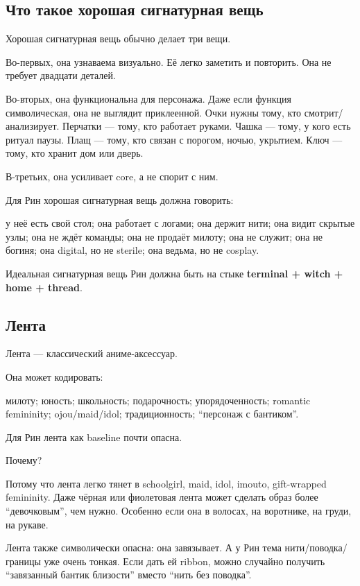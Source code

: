 \subsection*{Что такое хорошая сигнатурная вещь}

Хорошая сигнатурная вещь обычно делает три вещи.

Во-первых, она узнаваема визуально. Её легко заметить и повторить. Она
не требует двадцати деталей.

Во-вторых, она функциональна для персонажа. Даже если функция
символическая, она не выглядит приклеенной. Очки нужны тому, кто
смотрит/\hspace{0pt}анализирует. Перчатки --- тому, кто работает руками. Чашка ---
тому, у кого есть ритуал паузы. Плащ --- тому, кто связан с порогом,
ночью, укрытием. Ключ --- тому, кто хранит дом или дверь.

В-третьих, она усиливает core, а не спорит с ним.

Для Рин хорошая сигнатурная вещь должна говорить:

у неё есть свой стол; она работает с логами; она держит нити; она видит
скрытые узлы; она не ждёт команды; она не продаёт милоту; она не служит;
она не богиня; она digital, но не sterile; она ведьма, но не cosplay.

Идеальная сигнатурная вещь Рин должна быть на стыке \textbf{terminal +
witch + home + thread}.

\subsection*{Лента}

Лента --- классический аниме-аксессуар.

Она может кодировать:

милоту; юность; школьность; подарочность; упорядоченность; romantic
femininity; ojou/\hspace{0pt}maid/\hspace{0pt}idol; традиционность; ``персонаж с бантиком''.

Для Рин лента как baseline почти опасна.

Почему?

Потому что лента легко тянет в schoolgirl, maid, idol, imouto,
gift-wrapped femininity. Даже чёрная или фиолетовая лента может сделать
образ более ``девочковым'', чем нужно. Особенно если она в волосах, на
воротнике, на груди, на рукаве.

Лента также символически опасна: она завязывает. А у Рин тема
нити/\hspace{0pt}поводка/\hspace{0pt}границы уже очень тонкая. Если дать ей ribbon, можно
случайно получить ``завязанный бантик близости'' вместо ``нить без
поводка''.

